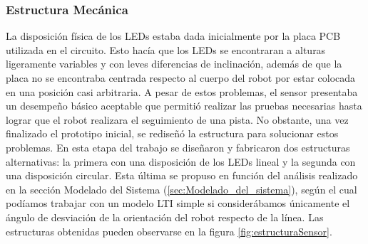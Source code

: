 \documentclass[10pt,conference,a4paper,onecolumn]{article}%
\begin{document}
\subsubsection{Estructura Mecánica}
La disposición física de los LEDs estaba dada inicialmente por la placa PCB utilizada en el circuito. Esto hacía que los LEDs se encontraran a alturas ligeramente variables y con leves diferencias de inclinación, además de que la placa no se encontraba centrada respecto al cuerpo del robot por estar colocada en una posición
casi arbitraria. A pesar de estos problemas, el sensor presentaba un desempeño básico aceptable que permitió realizar las pruebas necesarias hasta lograr que el robot realizara el seguimiento de una pista. No obstante, una vez finalizado el prototipo inicial, se rediseñó la estructura para solucionar estos problemas. En esta etapa
del trabajo se diseñaron y fabricaron dos estructuras alternativas: la primera con una disposición de los LEDs  lineal y la segunda con una disposición circular. Esta última se propuso en función del análisis realizado en la sección Modelado del Sistema (\ref{sec:Modelado_del_sistema}), según el cual podíamos trabajar con un modelo LTI simple
si considerábamos únicamente el ángulo de desviación de la orientación del robot respecto de la línea. Las estructuras obtenidas pueden observarse en la figura \ref{fig:estructuraSensor}. 
\end{document}
